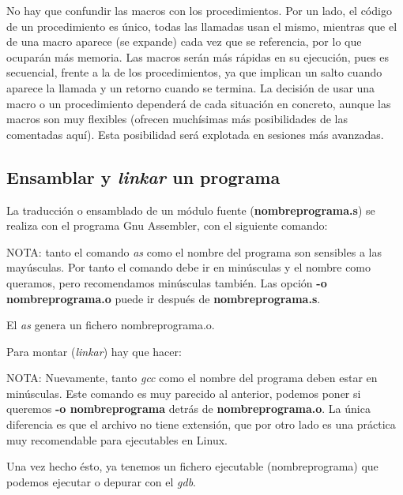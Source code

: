 \begin{itemize}
No hay que confundir las macros con los procedimientos. Por un lado,
el código de un procedimiento es único, todas las llamadas usan el
mismo, mientras que el de una macro aparece (se expande) cada vez que
se referencia, por lo que ocuparán más memoria. Las macros serán
más rápidas en su ejecución, pues es secuencial, frente a la de
los procedimientos, ya que implican un salto cuando aparece la llamada
y un retorno cuando se termina. La decisión de usar una macro o un
procedimiento dependerá de cada situación en concreto, aunque las
macros son muy flexibles (ofrecen muchísimas más posibilidades de las
comentadas aquí). Esta posibilidad será explotada en sesiones más avanzadas.

\end{itemize}

\subsection{Ensamblar y {\it linkar} un programa}

La traducción o ensamblado de un módulo fuente ({\bf nombreprograma.s})
se realiza con el programa Gnu Assembler, con el siguiente comando:

\hspace{2.5cm}{\bf as -o nombreprograma.o nombreprograma.s}

NOTA: tanto el comando {\it as} como el nombre del programa son sensibles
a las mayúsculas. Por tanto el comando debe ir en minúsculas y el nombre
como queramos, pero recomendamos minúsculas también.
Las opción {\bf -o nombreprograma.o} puede ir después de {\bf nombreprograma.s}.

El {\it as} genera un fichero nombreprograma.o.

Para montar ({\it linkar}) hay que hacer:

\hspace{2.5cm}{\bf gcc -o nombreprograma nombreprograma.o}

NOTA: Nuevamente, tanto {\it gcc} como el nombre del programa deben estar
en minúsculas. Este comando es muy parecido al anterior, podemos poner si
queremos {\bf -o nombreprograma} detrás de {\bf nombreprograma.o}. La única
diferencia es que el archivo no tiene extensión, que por otro lado es una
práctica muy recomendable para ejecutables en Linux.

Una vez hecho ésto, ya tenemos un fichero ejecutable (nombreprograma) que
podemos ejecutar o depurar con el {\it gdb}.


\chapterend{}

